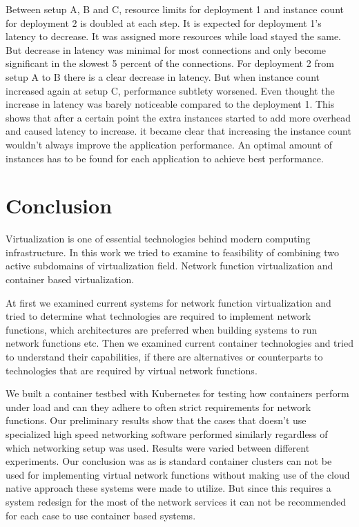 \documentclass[12pt,oneandhalf,chaparabic,ceng,ms,eng,oneside,pntc]{gsufbe}
\begin{document}
Between setup A, B and C, resource limits for deployment 1 and instance count for deployment 2 is 
doubled at each step.
It is expected for deployment 1's latency to decrease. It was assigned more resources while load 
stayed the same. But decrease in latency was minimal for most connections and only become significant
in the slowest 5 percent of the connections.
For deployment 2 from setup A to B there is a clear decrease in latency. But when instance count
increased again at setup C, performance subtlety worsened. Even thought
the increase in latency was barely noticeable compared to the deployment 1.
This shows that after a certain point the extra instances started to add more overhead and caused 
latency to increase. it became clear that increasing the instance count wouldn't always improve
the application performance.
An optimal amount of instances has to be found for each application to achieve best performance.

\chapter{Conclusion}
Virtualization is one of essential technologies behind modern computing infrastructure.  In this work we
tried to examine to feasibility of combining two active subdomains of virtualization field.  Network
function virtualization and container based virtualization.

At first we examined current systems for network function virtualization and tried to determine what
technologies are required to implement network functions, which architectures are preferred when
building systems to run network functions etc. Then we examined current container technologies and
tried to understand their capabilities, if there are alternatives or counterparts to technologies that
are required by virtual network functions.

We built a container testbed with Kubernetes for testing how containers perform under load and can they
adhere to often strict requirements for network functions.  Our preliminary results show that the cases
that doesn't use specialized high speed networking software performed similarly regardless of which
networking setup was used.  Results were varied between different experiments.  Our conclusion was as is
standard container clusters can not be used for implementing virtual network functions without making use
of the cloud native approach these systems were made to utilize. But since this requires a system redesign
for the most of the network services it can not be recommended for each case to use container based systems.
\end{document}
